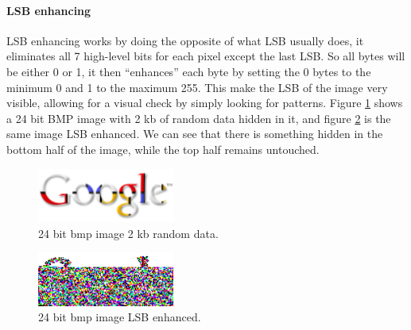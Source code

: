 
\paragraph*{LSB enhancing}
LSB enhancing works by doing the opposite of what LSB usually does, it eliminates all 7 high-level bits for each pixel except the last LSB. 
So all bytes will be either 0 or 1, it then ``enhances'' each byte by setting the 0 bytes to the minimum 0 and 1 to the maximum 255.
This make the LSB of the image very visible, allowing for a visual check by simply looking for patterns.
Figure \ref{fig:hiddengoodle} shows a 24 bit BMP image with 2 kb of random data hidden in it, and figure \ref{fig:LSBenhanced} is the same image LSB enhanced.
We can see that there is something hidden in the bottom half of the image, while the top half remains untouched\citep{Westfeld2000}.

\begin{figure}
	\centering
	\includegraphics[width=0.4\textwidth]{figures/google.png}
	\caption{24 bit bmp image 2 kb random data.}
	\label{fig:hiddengoodle}
\end{figure}

\begin{figure}
	\centering
	\includegraphics[width=0.4\textwidth]{figures/LSBenhanced.png}
	\caption{24 bit bmp image LSB enhanced.}
	\label{fig:LSBenhanced}
\end{figure}



